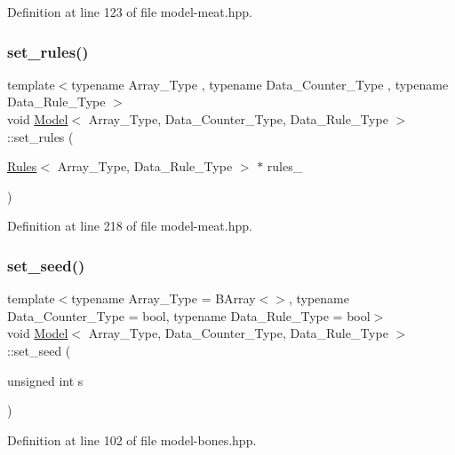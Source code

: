Definition at line 123 of file model-\/meat.\+hpp.

\mbox{\label{class_model_a86a46cf6fdc7c6514b97263f9ee4130b}} 
\subsubsection{\texorpdfstring{set\+\_\+rules()}{set\_rules()}}
{\footnotesize\ttfamily template$<$typename Array\+\_\+\+Type , typename Data\+\_\+\+Counter\+\_\+\+Type , typename Data\+\_\+\+Rule\+\_\+\+Type $>$ \\
void \hyperlink{class_model}{Model}$<$ Array\+\_\+\+Type, Data\+\_\+\+Counter\+\_\+\+Type, Data\+\_\+\+Rule\+\_\+\+Type $>$\+::set\+\_\+rules (\begin{DoxyParamCaption}\item[{\hyperlink{class_rules}{Rules}$<$ Array\+\_\+\+Type, Data\+\_\+\+Rule\+\_\+\+Type $>$ $\ast$}]{rules\+\_\+ }\end{DoxyParamCaption})\hspace{0.3cm}{\ttfamily [inline]}}



Definition at line 218 of file model-\/meat.\+hpp.

\mbox{\label{class_model_a5baf09853382529460889f15076bc64a}} 
\subsubsection{\texorpdfstring{set\+\_\+seed()}{set\_seed()}}
{\footnotesize\ttfamily template$<$typename Array\+\_\+\+Type = B\+Array$<$$>$, typename Data\+\_\+\+Counter\+\_\+\+Type = bool, typename Data\+\_\+\+Rule\+\_\+\+Type = bool$>$ \\
void \hyperlink{class_model}{Model}$<$ Array\+\_\+\+Type, Data\+\_\+\+Counter\+\_\+\+Type, Data\+\_\+\+Rule\+\_\+\+Type $>$\+::set\+\_\+seed (\begin{DoxyParamCaption}\item[{unsigned int}]{s }\end{DoxyParamCaption})\hspace{0.3cm}{\ttfamily [inline]}}



Definition at line 102 of file model-\/bones.\+hpp.

